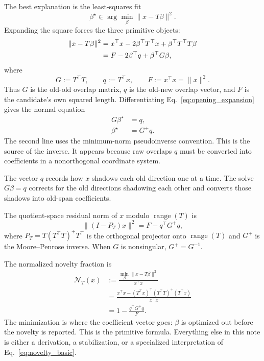 \documentclass[10pt,twocolumn]{article}
\newcommand{\range}{\operatorname{range}}
\newcommand{\nov}{\mathcal N}
\begin{document}
The best explanation is the least-squares fit
\begin{equation}
\beta^\star\in\arg\min_\beta \|x-T\beta\|^2.
\label{eq:opening_ls}
\end{equation}
Expanding the square forces the three primitive objects:
\begin{align}
\|x-T\beta\|^2
&=x^\top x-2\beta^\top T^\top x+\beta^\top T^\top T\beta\notag\\
&=F-2\beta^\top q+\beta^\top G\beta,
\label{eq:opening_expansion}
\end{align}
where
\begin{equation}
G:=T^\top T,
\qquad
q:=T^\top x,
\qquad
F:=x^\top x=\|x\|^2.
\label{eq:GqF}
\end{equation}
Thus \(G\) is the old-old overlap matrix, \(q\) is the old-new overlap vector, and \(F\) is the candidate's own squared length. Differentiating Eq.~\eqref{eq:opening_expansion} gives the normal equation
\begin{equation}
\begin{aligned}
G\beta^\star&=q,\\
\beta^\star&=G^+q.
\end{aligned}
\label{eq:opening_normal}
\end{equation}
The second line uses the minimum-norm pseudoinverse convention.
This is the source of the inverse. It appears because raw overlaps \(q\) must be converted into coefficients in a nonorthogonal coordinate system.

\begin{cautionbox}
The vector \(q\) records how \(x\) shadows each old direction one at a time. The solve \(G\beta=q\) corrects for the old directions shadowing each other and converts those shadows into old-span coefficients.
\end{cautionbox}

\begin{jargonbox}
The quotient-space residual norm of $x$ modulo $\range(T)$ is
\begin{equation}
\|(I-P_T)x\|^2
=F-q^\top G^+q,
\label{eq:headline_residual}
\end{equation}
where $P_T=T(T^\top T)^+T^\top$ is the orthogonal projector onto $\range(T)$ and $G^+$ is the Moore--Penrose inverse. When $G$ is nonsingular, $G^+=G^{-1}$.
\end{jargonbox}

The normalized novelty fraction is
\begin{equation}
\boxed{
\begin{aligned}
\nov_T(x)
&:=\frac{\min_\beta\|x-T\beta\|^2}{x^\top x}\\
&=\frac{x^\top x-(T^\top x)^\top(T^\top T)^+(T^\top x)}{x^\top x}\\
&=1-\frac{q^\top G^+q}{F}.
\end{aligned}
}
\label{eq:novelty_basic}
\end{equation}
The minimization is where the coefficient vector goes: \(\beta\) is optimized out before the novelty is reported.
This is the primitive formula. Everything else in this note is either a derivation, a stabilization, or a specialized interpretation of Eq.~\eqref{eq:novelty_basic}.
\end{document}
